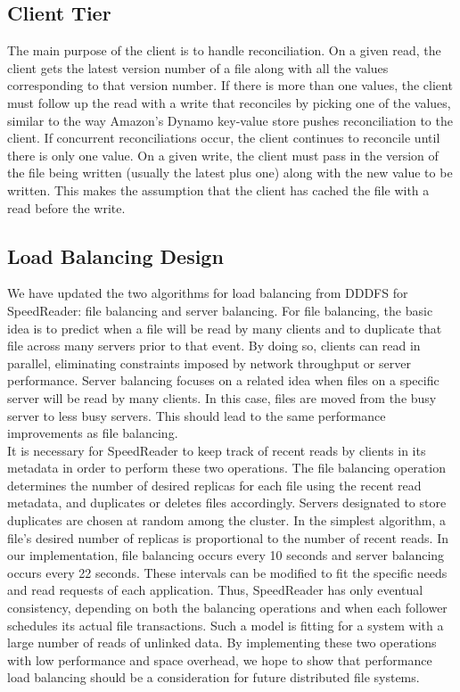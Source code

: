 \documentclass[twoside]{article}
\begin{document}
\begin{multicols}{2}
\subsection*{Client Tier}
The main purpose of the client is to handle reconciliation. On a given read, the client gets the latest version number of a file along with all the values corresponding to that version number. If there is more than one values, the client must follow up the read with a write that reconciles by picking one of the values, similar to the way Amazon's Dynamo key-value store pushes reconciliation to the client. If concurrent reconciliations occur, the client continues to reconcile until there is only one value. On a given write, the client must pass in the version of the file being written (usually the latest plus one) along with the new value to be written. This makes the assumption that the client has cached the file with a read before the write. 
\subsection*{Load Balancing Design}
We have updated the two algorithms for load balancing from DDDFS for SpeedReader: file balancing and server balancing. For file balancing, the basic idea is to predict when a file will be read by many clients and to duplicate that file across many servers prior to that event. By doing so, clients can read in parallel, eliminating constraints imposed by network throughput or server performance. Server balancing focuses on a related idea when files on a specific server will be read by many clients. In this case, files are moved from the busy server to less busy servers. This should lead to the same performance improvements as file balancing. \\\indent
It is necessary for SpeedReader to keep track of recent reads by clients in its metadata in order to perform these two operations.  The file balancing operation determines the number of desired replicas for each file using the recent read metadata, and duplicates or deletes files accordingly. Servers designated to store duplicates are chosen at random among the cluster. In the simplest algorithm, a file's desired number of replicas is proportional to the number of recent reads. In our implementation, file balancing occurs every 10 seconds and server balancing occurs every 22 seconds. These intervals can be modified to fit the specific needs and read requests of each application. Thus, SpeedReader has only eventual consistency, depending on both the balancing operations and when each follower schedules its actual file transactions. Such a model is fitting for a system with a large number of reads of unlinked data. By implementing these two operations with low performance and space overhead, we hope to show that performance load balancing should be a consideration for future distributed file systems.


\end{multicols}
\end{document}
